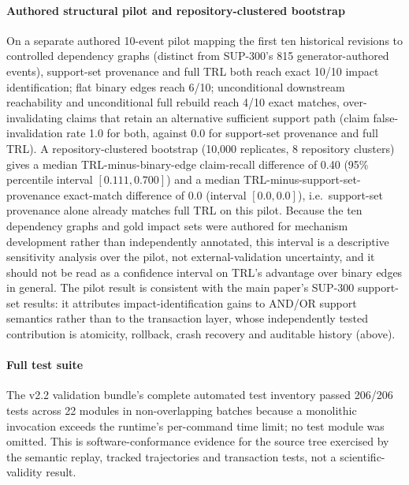 \documentclass[journal]{IEEEtran}
\begin{document}
\paragraph{Authored structural pilot and repository-clustered bootstrap} On a separate authored 10-event pilot mapping the first ten historical revisions to controlled dependency graphs (distinct from SUP-300's 815 generator-authored events), support-set provenance and full TRL both reach exact 10/10 impact identification; flat binary edges reach 6/10; unconditional downstream reachability and unconditional full rebuild reach 4/10 exact matches, over-invalidating claims that retain an alternative sufficient support path (claim false-invalidation rate 1.0 for both, against 0.0 for support-set provenance and full TRL). A repository-clustered bootstrap (10,000 replicates, 8 repository clusters) gives a median TRL-minus-binary-edge claim-recall difference of 0.40 (95\% percentile interval $[0.111,0.700]$) and a median TRL-minus-support-set-provenance exact-match difference of 0.0 (interval $[0.0,0.0]$), i.e.\ support-set provenance alone already matches full TRL on this pilot. Because the ten dependency graphs and gold impact sets were authored for mechanism development rather than independently annotated, this interval is a descriptive sensitivity analysis over the pilot, not external-validation uncertainty, and it should not be read as a confidence interval on TRL's advantage over binary edges in general. The pilot result is consistent with the main paper's SUP-300 support-set results: it attributes impact-identification gains to AND/OR support semantics rather than to the transaction layer, whose independently tested contribution is atomicity, rollback, crash recovery and auditable history (above).

\paragraph{Full test suite} The v2.2 validation bundle's complete automated test inventory passed 206/206 tests across 22 modules in non-overlapping batches because a monolithic invocation exceeds the runtime's per-command time limit; no test module was omitted. This is software-conformance evidence for the source tree exercised by the semantic replay, tracked trajectories and transaction tests, not a scientific-validity result.
\end{document}
